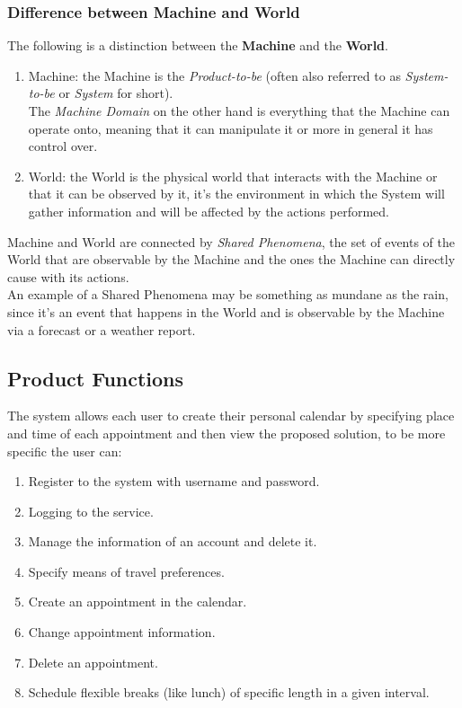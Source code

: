 \begin{samepage}
\subsubsection*{Difference between Machine and World}
The following is a distinction between the \textbf{Machine} and the \textbf{World}.
\begin{enumerate}
\item Machine: the Machine is the \textit{Product-to-be} (often also referred to as \textit{System-to-be} or \emph{System} for short).
\\The \textit{Machine Domain} on the other hand is everything that the Machine can operate onto, meaning that it can manipulate it or more in general it has control over.
\item World: the World is the physical world that interacts with the Machine or that it can be observed by it, it's the environment in which the System will gather information and will be affected by the actions performed.
\end{enumerate}
Machine and World are connected by \textit{Shared Phenomena}, the set of events of the World that are observable by the Machine and the ones the Machine can directly cause with its actions.
\\An example of a Shared Phenomena may be something as mundane as the rain, since it's an event that happens in the World and is observable by the Machine via a forecast or a weather report.
\subsection{Product Functions}
The system allows each user to create their personal calendar by specifying place and time of each appointment and then view the proposed solution, to be more specific the user can:
\begin{enumerate}
\item Register to the system with username and password.
\item Logging to the service.
\item Manage the information of an account and delete it.
\item Specify means of travel preferences.
\item Create an appointment in the calendar.
\item Change appointment information.
\item Delete an appointment.
\item Schedule flexible breaks (like lunch) of specific length in a given interval.
\end{enumerate}
\par

\end{samepage}
